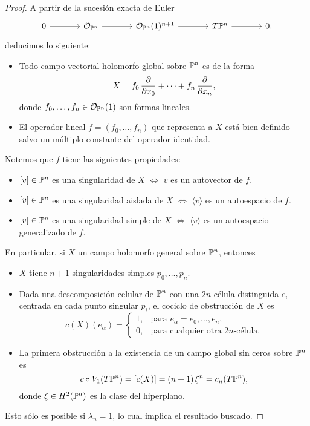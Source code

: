 \begin{proof}
A partir de la sucesión exacta de Euler \cite[pp. 93-94]{huybrechts}
$$
\begin{tikzcd}[row sep = large, column sep = large]
    0 \arrow[r] & \O_{\P^n} \arrow[r] & \O_{\P^n}(1)^{n+1} \arrow[r] & T\P^n \arrow[r] & 0,
\end{tikzcd}
$$
deducimos lo siguiente:
\begin{itemize}
    \itemsep 0em
    \item Todo campo vectorial holomorfo global sobre $\P^n$ es de la forma
    $$X = f_0 \, \p {x_0} + \dots + f_n \, \p {x_n},$$
    donde $f_0, \dots, f_n \in \O_{\P^n}(1)$ son formas lineales.
    
    \item El operador lineal $f = (f_0, \dots, f_n)$ que representa a $X$ está bien definido salvo un múltiplo constante del operador identidad.
\end{itemize}
Notemos que $f$ tiene las siguientes propiedades:
\begin{itemize}
    \itemsep 0em
    \item $[v] \in \P^n$ es una singularidad de $X$ $\iff$ $v$ es un autovector de $f$.
    \item $[v] \in \P^n$ es una singularidad aislada de $X$ $\iff$ $\langle v \rangle$ es un autoespacio de $f$.
    \item $[v] \in \P^n$ es una singularidad simple de $X$ $\iff$ $\langle v \rangle$ es un autoespacio generalizado de $f$.
\end{itemize}
En particular, si $X$ un campo holomorfo general sobre $\P^n$, entonces
\begin{itemize}
    \itemsep 0em
    \item $X$ tiene $n+1$ singularidades simples $p_0, \dots, p_n$.
    \item Dada una descomposición celular de $\P^n$ con una $2n$-célula distinguida $e_i$ centrada en cada punto singular $p_i$, el cociclo de obstrucción de $X$ es
    $$
    c(X)(e_\alpha) =
        \begin{cases}
            1, & \text{para $e_\alpha = e_0, \dots, e_n$,} \\
            0, & \text{para cualquier otra $2n$-célula.}
        \end{cases}
    $$
    
    \item La primera obstrucción a la existencia de un campo global sin ceros sobre $\P^n$ es
    $$c \circ V_1(T\P^n) = [c(X)] = (n+1) \, \xi^n = c_n(T\P^n),$$
    donde $\xi \in H^2(\P^n)$ es la clase del hiperplano.
\end{itemize}
Esto sólo es posible si $\lambda_n = 1$, lo cual implica el resultado buscado.
\end{proof}

